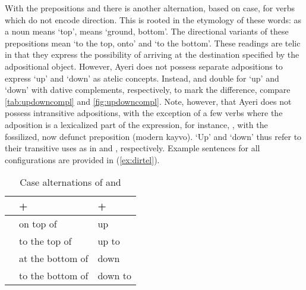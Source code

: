 \label{phsec:lingavandat}
With the prepositions  and  there is another alternation, based on case, for
verbs which do not encode direction. This is rooted in the
etymology of these words:  as a noun means `top',
 means `ground, bottom'. The directional variants of these
prepositions mean `to the top, onto' and `to the bottom'. These readings are
telic in that they express the possibility of arriving at the
destination specified by the adpositional object. However, Ayeri does not possess separate
adpositions to express `up' and `down' as atelic concepts.
Instead,  and  double for `up' and `down' with
dative complements, respectively, to mark the difference,
compare \autoref{tab:updowncompl} and \autoref{fig:updowncompl}. Note, however,
that Ayeri does not possess intransitive adpositions, with the exception of a
few verbs where the adposition is a lexicalized part of the
expression, for instance, , with
the fossilized, now defunct preposition 
(modern  {kayvo}). `Up' and `down' thus refer to their transitive
uses as in  and , respectively. Example
sentences for all configurations are provided in (\ref{ex:dirtel}).

\begin{table}\centering
\caption{Case alternations of  and }

\begin{tabu} to \linewidth {X X[c] X[c]}
\toprule\tableheaderfont

%
	& +~\Loc
	& +~\Dat
	\\

\toprule

	& on top of
	& up
	\\


	& to the top of
	& up to
	\\

\midrule

	& at the bottom of
	& down
	\\


	& to the bottom of
	& down to
	\\

\bottomrule
\end{tabu}

\label{tab:updowncompl}
\end{table}

